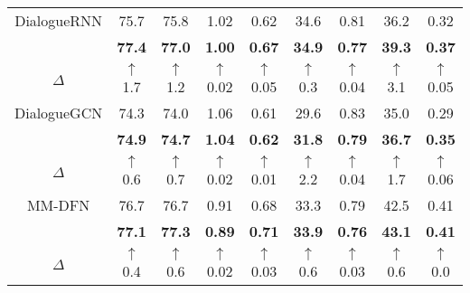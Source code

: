 {{\begin{table*}[htbp]
{\begin{tabular}{c|ccccc|ccc}
			\multicolumn{1}{c|}{DialogueRNN \cite{majumder2019dialoguernn}} & 75.7  & 75.8 & 1.02 & 0.62 & 34.6  & 0.81   & 36.2   & 0.32  \\
			\rowcolor{gray!30}
			\multicolumn{1}{c|}{DialogueRNN$^\ast$} & \textbf{77.4}  & \textbf{77.0} & \textbf{1.00} & \textbf{0.67} & \textbf{34.9}  & \textbf{0.77}   & \textbf{39.3}   & \textbf{0.37}  \\ 
			$\Delta$ & \textcolor[rgb]{0.0,0.6,0.0}{$\uparrow$1.7} & \textcolor[rgb]{0.0,0.6,0.0}{$\uparrow$1.2}  & \textcolor[rgb]{0.0,0.6,0.0}{$\uparrow$0.02}  &  \textcolor[rgb]{0.0,0.6,0.0}{$\uparrow$0.05} & \textcolor[rgb]{0.0,0.6,0.0}{$\uparrow$0.3} &\textcolor[rgb]{0.0,0.6,0.0}{$\uparrow$0.04}  & \textcolor[rgb]{0.0,0.6,0.0}{$\uparrow$3.1} & \textcolor[rgb]{0.0,0.6,0.0}{$\uparrow$0.05}\\ \hline
			
			\multicolumn{1}{c|}{DialogueGCN \cite{ghosal2019dialoguegcn}} & 74.3  & 74.0 & 1.06 & 0.61 & 29.6  & 0.83   & 35.0   & 0.29  \\
			\rowcolor{gray!30}
			\multicolumn{1}{c|}{DialogueGCN$^\ast$} & \textbf{74.9}  & \textbf{74.7} & \textbf{1.04} & \textbf{0.62} & \textbf{31.8}  & \textbf{0.79}   & \textbf{36.7}   & \textbf{0.35}  \\ 
			$\Delta$ & \textcolor[rgb]{0.0,0.6,0.0}{$\uparrow$0.6}  & \textcolor[rgb]{0.0,0.6,0.0}{$\uparrow$0.7}  &  \textcolor[rgb]{0.0,0.6,0.0}{$\uparrow$0.02} & \textcolor[rgb]{0.0,0.6,0.0}{$\uparrow$0.01}  & \textcolor[rgb]{0.0,0.6,0.0}{$\uparrow$2.2} & \textcolor[rgb]{0.0,0.6,0.0}{$\uparrow$0.04}  & \textcolor[rgb]{0.0,0.6,0.0}{$\uparrow$1.7} & \textcolor[rgb]{0.0,0.6,0.0}{$\uparrow$0.06} \\ \hline
			
			\multicolumn{1}{c|}{MM-DFN \cite{hu2022mm}}      & 76.7  & 76.7 & 0.91 & 0.68 & 33.3  & 0.79   & 42.5   & 0.41  \\
			\rowcolor{gray!30}
			\multicolumn{1}{c|}{MM-DFN$^\ast$}      & \textbf{77.1}  & \textbf{77.3} & \textbf{0.89} & \textbf{0.71} & \textbf{33.9}  & \textbf{0.76}  &\textbf{43.1}   & \textbf{0.41}  \\ 
			$\Delta$ & \textcolor[rgb]{0.0,0.6,0.0}{$\uparrow$0.4} & \textcolor[rgb]{0.0,0.6,0.0}{$\uparrow$0.6}  & \textcolor[rgb]{0.0,0.6,0.0}{$\uparrow$0.02}  & \textcolor[rgb]{0.0,0.6,0.0}{$\uparrow$0.03}  & \textcolor[rgb]{0.0,0.6,0.0}{$\uparrow$0.6} & \textcolor[rgb]{0.0,0.6,0.0}{$\uparrow$0.03}  & \textcolor[rgb]{0.0,0.6,0.0}{$\uparrow$0.6} & \textcolor[rgb]{0.0,0.6,0.0}{$\uparrow$0.0} \\ \hline
			

\end{tabular}}
\end{table*}}}
